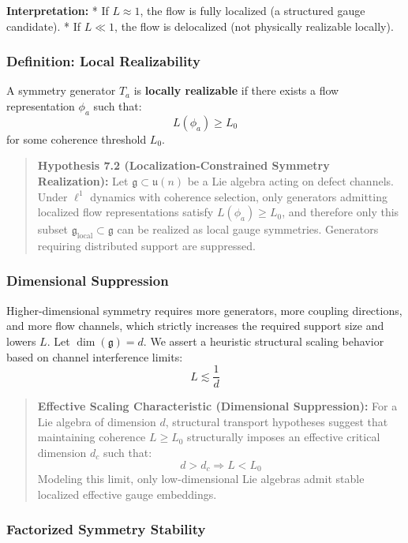 \documentclass[
]{article}
\begin{document}
\textbf{Interpretation:} * If \(L \approx 1\), the flow is fully
localized (a structured gauge candidate). * If \(L \ll 1\), the flow is
delocalized (not physically realizable locally).

\subsubsection{Definition: Local
Realizability}\label{definition-local-realizability}

A symmetry generator \(T_a\) is \textbf{locally realizable} if there
exists a flow representation \(\phi_a\) such that:
\[ L(\phi_a) \geq L_0 \] for some coherence threshold \(L_0\).

\begin{quote}
\textbf{Hypothesis 7.2 (Localization-Constrained Symmetry Realization):}
Let \(\mathfrak{g} \subset \mathfrak{u}(n)\) be a Lie algebra acting on
defect channels. Under \(\ell^1\) dynamics with coherence selection,
only generators admitting localized flow representations satisfy
\(L(\phi_a) \geq L_0\), and therefore only this subset
\(\mathfrak{g}_{\text{local}} \subset \mathfrak{g}\) can be realized as
local gauge symmetries. Generators requiring distributed support are
suppressed.
\end{quote}

\subsubsection{Dimensional Suppression}\label{dimensional-suppression}

Higher-dimensional symmetry requires more generators, more coupling
directions, and more flow channels, which strictly increases the
required support size and lowers \(L\). Let \(\dim(\mathfrak{g}) = d\).
We assert a heuristic structural scaling behavior based on channel
interference limits: \[ L \lesssim \frac{1}{d} \]

\begin{quote}
\textbf{Effective Scaling Characteristic (Dimensional Suppression):} For
a Lie algebra of dimension \(d\), structural transport hypotheses
suggest that maintaining coherence \(L \ge L_0\) structurally imposes an
effective critical dimension \(d_c\) such that:
\[ d > d_c \Rightarrow L < L_0 \] Modeling this limit, only
low-dimensional Lie algebras admit stable localized effective gauge
embeddings.
\end{quote}

\subsubsection{Factorized Symmetry
Stability}\label{factorized-symmetry-stability}
\end{document}
